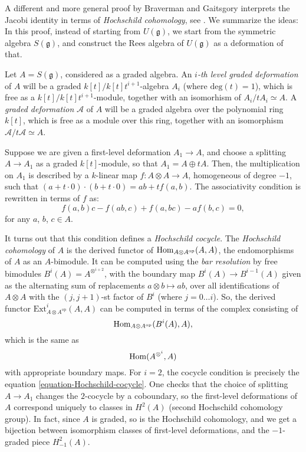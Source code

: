\begin{remark}
 \label{remark-PBW-Hochschild}
A different and more general proof by Braverman and Gaitsgory interprets the Jacobi identity in terms of \emph{Hochschild cohomology}, see \cite{Braverman-Gaitsgory-PBW}. We summarize the ideas: In this proof, instead of starting from $U(\mathfrak g)$, we start from the symmetric algebra $S(\mathfrak g)$, and construct the Rees algebra of $U(\mathfrak g)$ as a deformation of that. 

Let $A=S(\mathfrak g)$, considered as a graded algebra. An \emph{$i$-th level graded deformation} of $A$ will be a graded $k[t]/k[t]t^{i+1}$-algebra $A_i$ (where $\text{deg}(t)=1$), which is free as a $k[t]/k[t]t^{i+1}$-module, together with an isomorhism of $A_i/tA_i \simeq A$. A \emph{graded deformation} $\mathcal A$ of $A$ will be a graded algebra over the
polynomial ring $k[t]$, which is free as a module over this ring,
together with an isomorphism $\mathcal A/t\mathcal A\simeq A$.

Suppose we are given a first-level deformation $A_1 \to A $, and choose a splitting $A\to A_1$ as a graded $k[t]$-module, so that $A_1 = A \oplus t A$. Then, the multiplication on $A_1$ is described by a $k$-linear map $f: A\otimes A \to A$, homogeneous of degree $-1$, such that $(a+t \cdot 0)\cdot (b+t\cdot 0) = ab + t f(a,b)$. The associativity condition is rewritten in terms of $f$ as:
\begin{equation}
 \label{equation-Hochschild-cocycle}
f (a, b)c - f (ab, c) + f (a, bc) - af (b, c) = 0, 
\end{equation}
for any $a$, $b$, $c \in A$.

It turns out that this condition defines a \emph{Hochschild cocycle}. The \emph{Hochschild cohomology} of $A$ is the derived functor of $\mathop{\rm Hom}\nolimits_{A\otimes A^{\text{op}}} (A,A)$, the endomorphisms of $A$ as an $A$-bimodule. It can be computed using the \emph{bar resolution} by free bimodules $B^i (A) = A^{\otimes^{i+2}}$, with the boundary map $B^i (A) \to B^{i-1}(A)$ given as the alternating sum of replacements $a\otimes b \mapsto ab$, over all identifications of $A\otimes A$ with the $(j, j+1)$-st factor of $B^i$ (where $j=0\dots i$). So, the derived functor $\text{Ext}^i_{A\otimes A^{\text{op}}} (A,A)$ can be computed in terms of the complex consisting of 
$$ \mathop{\rm Hom}\nolimits_{A\otimes A^{\text{op}}} (B^i(A),A),$$
which is the same as 
$$\mathop{\rm Hom}\nolimits (A^{\otimes^i},A)$$
with appropriate boundary maps. For $i=2$, the cocycle condition is precisely the equation \eqref{equation-Hochschild-cocycle}. One checks that the choice of splitting $A\to A_1$ changes the $2$-cocycle by a coboundary, so the first-level deformations of $A$ correspond uniquely to classes in $H^2(A)$ (second Hochschild cohomology group). In fact, since $A$ is graded, so is the Hochschild cohomology, and we get a bijection between isomorphism classes of first-level deformations, and the $-1$-graded piece $H^2_{-1}(A)$. 


\end{remark}
